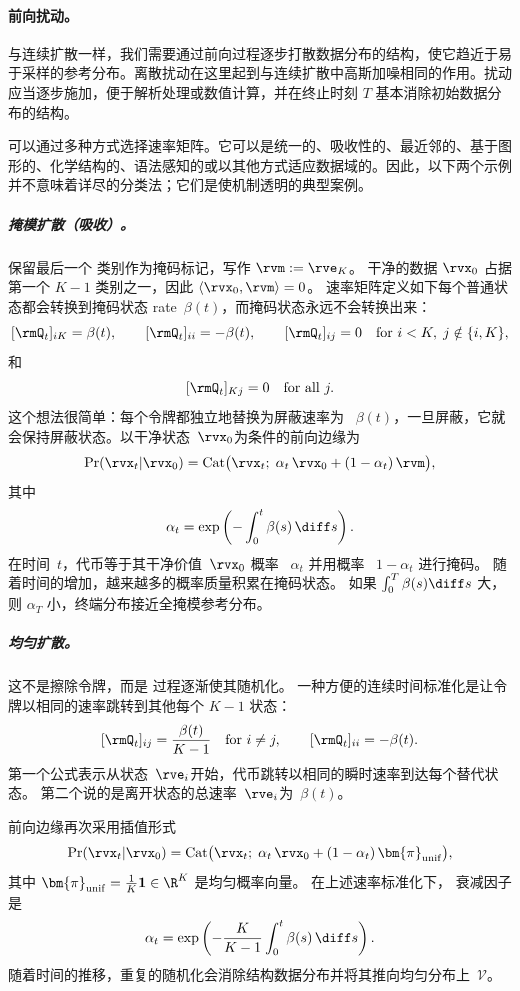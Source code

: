 \paragraph{前向扰动。}
与连续扩散一样，我们需要通过前向过程逐步打散数据分布的结构，使它趋近于易于采样的参考分布。离散扰动在这里起到与连续扩散中高斯加噪相同的作用。扰动应当逐步施加，便于解析处理或数值计算，并在终止时刻 $T$ 基本消除初始数据分布的结构。

可以通过多种方式选择速率矩阵。它可以是统一的、吸收性的、最近邻的、基于图形的、化学结构的、语法感知的或以其他方式适应数据域的。因此，以下两个示例并不意味着详尽的分类法；它们是使机制透明的典型案例。
\subparagraph{掩模扩散（吸收）。} 保留最后一个
      类别作为掩码标记，写作 $\rvm := \rve_K$。  干净的数据
      $\rvx_0$ 占据第一个 $K{-}1$ 类别之一，因此
      $\langle\rvx_0,\rvm\rangle = 0$。  速率矩阵定义如下每个普通状态都会转换到掩码状态
      rate~$\beta(t)$，而掩码状态永远不会转换出来：
\[
[\rmQ_t]_{iK}=\beta(t),\qquad
[\rmQ_t]_{ii}=-\beta(t),\qquad
[\rmQ_t]_{ij}=0
\quad
\text{for } i<K,\; j\notin\{i,K\},
\]
和
\[
[\rmQ_t]_{Kj}=0
\quad
\text{for all } j.
\]
      这个想法很简单：每个令牌都独立地替换为屏蔽速率为 ~$\beta(t)$，一旦屏蔽，它就会保持屏蔽状态。以干净状态~$\rvx_0$为条件的前向边缘为
      \[
      \Pr(\rvx_t | \rvx_0)
      = \mathrm{Cat}\bigl(\rvx_t;\;
          \alpha_t\,\rvx_0 + (1-\alpha_t)\,\rvm\bigr),
      \]
      其中
      \[
      \alpha_t
      =
      \exp\left(-\int_0^t\beta(s)\,\diff s\right).
      \]
      在时间~$t$，代币等于其干净价值~$\rvx_0$
      概率 ~$\alpha_t$ 并用概率 ~$1-\alpha_t$ 进行掩码。
      随着时间的增加，越来越多的概率质量积累在掩码状态。  如果 $\int_0^T\beta(s)\diff s$ 大，则 $\alpha_T$ 小，终端分布接近全掩模参考分布。

\subparagraph{均匀扩散。} 这不是擦除令牌，而是
      过程逐渐使其随机化。  一种方便的连续时间标准化是让令牌以相同的速率跳转到其他每个 $K-1$ 状态：
      \[
      [\rmQ_t]_{ij} = \frac{\beta(t)}{K - 1}
      \quad\text{for } i \neq j,
      \qquad
      [\rmQ_t]_{ii} = -\beta(t).
      \]
      第一个公式表示从状态~$\rve_i$开始，代币跳转以相同的瞬时速率到达每个替代状态。  第二个说的是离开状态的总速率~$\rve_i$为~$\beta(t)$。

      前向边缘再次采用插值形式
      \[
      \Pr(\rvx_t|\rvx_0)
      = \mathrm{Cat} \bigl(\rvx_t;\;
          \alpha_t\,\rvx_0 + (1-\alpha_t)\,\bm{\pi}_{\mathrm{unif}}
        \bigr),
      \]
      其中
      $\bm{\pi}_{\mathrm{unif}}=\tfrac{1}{K}\mathbf{1}\in\R^K$ 是均匀概率向量。  在上述速率标准化下，
      衰减因子是
      \[
      \alpha_t
      =
      \exp\left(
      -\frac{K}{K-1}\int_0^t \beta(s)\,\diff s
      \right).
      \]
      随着时间的推移，重复的随机化会消除结构数据分布并将其推向均匀分布上~$\mathcal{V}$。

